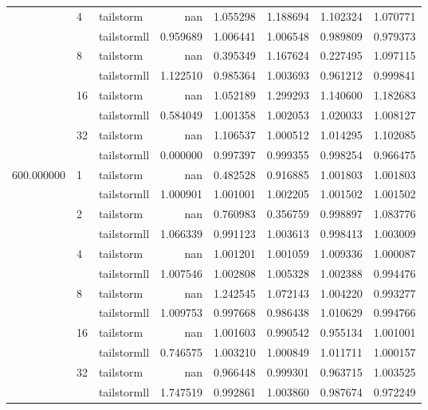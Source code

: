 \begin{tabular}{lllrrrrr}
 & \multirow[c]{2}{*}{4} & tailstorm & nan & 1.055298 & 1.188694 & 1.102324 & 1.070771 \\
 &  & tailstormll & 0.959689 & 1.006441 & 1.006548 & 0.989809 & 0.979373 \\
 & \multirow[c]{2}{*}{8} & tailstorm & nan & 0.395349 & 1.167624 & 0.227495 & 1.097115 \\
 &  & tailstormll & 1.122510 & 0.985364 & 1.003693 & 0.961212 & 0.999841 \\
 & \multirow[c]{2}{*}{16} & tailstorm & nan & 1.052189 & 1.299293 & 1.140600 & 1.182683 \\
 &  & tailstormll & 0.584049 & 1.001358 & 1.002053 & 1.020033 & 1.008127 \\
 & \multirow[c]{2}{*}{32} & tailstorm & nan & 1.106537 & 1.000512 & 1.014295 & 1.102085 \\
 &  & tailstormll & 0.000000 & 0.997397 & 0.999355 & 0.998254 & 0.966475 \\
\multirow[c]{12}{*}{600.000000} & \multirow[c]{2}{*}{1} & tailstorm & nan & 0.482528 & 0.916885 & 1.001803 & 1.001803 \\
 &  & tailstormll & 1.000901 & 1.001001 & 1.002205 & 1.001502 & 1.001502 \\
 & \multirow[c]{2}{*}{2} & tailstorm & nan & 0.760983 & 0.356759 & 0.998897 & 1.083776 \\
 &  & tailstormll & 1.066339 & 0.991123 & 1.003613 & 0.998413 & 1.003009 \\
 & \multirow[c]{2}{*}{4} & tailstorm & nan & 1.001201 & 1.001059 & 1.009336 & 1.000087 \\
 &  & tailstormll & 1.007546 & 1.002808 & 1.005328 & 1.002388 & 0.994476 \\
 & \multirow[c]{2}{*}{8} & tailstorm & nan & 1.242545 & 1.072143 & 1.004220 & 0.993277 \\
 &  & tailstormll & 1.009753 & 0.997668 & 0.986438 & 1.010629 & 0.994766 \\
 & \multirow[c]{2}{*}{16} & tailstorm & nan & 1.001603 & 0.990542 & 0.955134 & 1.001001 \\
 &  & tailstormll & 0.746575 & 1.003210 & 1.000849 & 1.011711 & 1.000157 \\
 & \multirow[c]{2}{*}{32} & tailstorm & nan & 0.966448 & 0.999301 & 0.963715 & 1.003525 \\
 &  & tailstormll & 1.747519 & 0.992861 & 1.003860 & 0.987674 & 0.972249 \\
\end{tabular}
